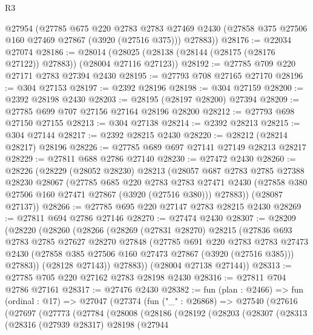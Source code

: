 \begin{lexlean}{R3}
\begin{coremodule}
      @27954
      (@27785
        @675
        @220
        @2783
        @2783
        @27469
        @2430
        (@27858 @375 @27506 @160 @27469 @27867 (@3920 (@27516 @375)))
        @27883))
@28176 := @22034 @27074
@28186 := @28014 (@28025 (@28138 (@28144 (@28175 (@28176 @27122)) @27883)) (@28004 @27116 @27123))
@28192 := @27785 @709 @220 @27171 @2783 @27394 @2430
@28195 := @27793 @708 @27165 @27170
@28196 := @304 @27153
@28197 := @2392 @28196
@28198 := @304 @27159
@28200 := @2392 @28198 @2430
@28203 := @28195 (@28197 @28200) @27394
@28209 := @27785 @699 @707 @27156 @27164 @28196 @28200
@28212 := @27793 @698 @27150 @27155
@28213 := @304 @27138
@28214 := @2392 @28213
@28215 := @304 @27144
@28217 := @2392 @28215 @2430
@28220 := @28212 (@28214 @28217) @28196
@28226 := @27785 @689 @697 @27141 @27149 @28213 @28217
@28229 := @27811 @688 @2786 @27140
@28230 := @27472 @2430
@28260 := @28226
    (@28229
      (@28052 @28230)
      @28213
      (@28057
        @687
        @2783
        @2785
        @27388
        @28230
        @28067
        (@27785
          @685
          @220
          @2783
          @2783
          @27471
          @2430
          (@27858 @380 @27506 @160 @27471 @27867 (@3920 (@27516 @380)))
          @27883))
      (@28087 @27137))
@28266 := @27785 @695 @220 @27147 @2783 @28215 @2430
@28269 := @27811 @694 @2786 @27146
@28270 := @27474 @2430
@28307 := @28209
    (@28220
      (@28260
        (@28266
          (@28269
            (@27831 @28270)
            @28215
            (@27836
              @693
              @2783
              @2785
              @27627
              @28270
              @27848
              (@27785
                @691
                @220
                @2783
                @2783
                @27473
                @2430
                (@27858 @385 @27506 @160 @27473 @27867 (@3920 (@27516 @385)))
                @27883))
            (@28128 @27143))
          @27883))
      (@28004 @27138 @27144))
@28313 := @27785 @705 @220 @27162 @2783 @28198 @2430
@28316 := @27811 @704 @2786 @27161
@28317 := @27476 @2430
@28382 := fun (plan : @2466) =>
  fun (ordinal : @17) =>
  @27047
    (@27374
      (fun ("_" : @26868) =>
      @27540
        (@27616
          (@27697
            (@27773
              (@27784
                (@28008
                  (@28186
                    (@28192
                      (@28203
                        (@28307
                          (@28313
                            (@28316
                              (@27939 @28317)
                              @28198
                              (@27944

\end{coremodule}
\end{lexlean}
